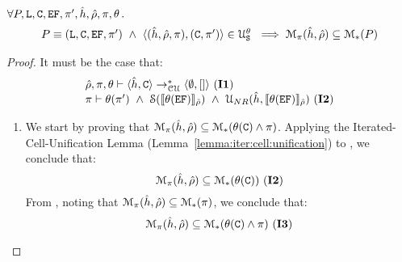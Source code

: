 \begin{temax}
$\forall P, \mathtt{L}, \mathtt{C}, \mathtt{EF}, \pi',  \hat{h}, \hat\rho, \pi, \theta \, .$
$$
\begin{array}{l}
P \equiv (\mathtt{L}, \mathtt{C}, \mathtt{EF}, \pi') \ \wedge \ \langle (\hat{h}, \hat\rho, \pi), (\mathtt{C}, \pi') \rangle \in {\cal U}_{\mathtt{S}}^{\theta} \
    \implies \mathcal{M}_{\pi}(\hat{h}, \hat\rho) \subseteq \mathcal{M}_{*}(P)   
\end{array}
$$ 
\end{temax}
\begin{proof}
It must be the case that: 
$$
\begin{array}{l}
\cellunificationiter{\sheap, \cells}{\hemp, []}{\sstore, \pc, \subst} \text{ (\ieq{1})} \\
%
\pc \vdash \subst(\pfs') \ \wedge \ \sanity{\symbeval{\subst(\efs)}{\sstore}} \ \wedge \  \unificationef{\sheap}{\symbeval{\subst(\efs)}{\sstore}} \text{ (\ieq{2})}
\end{array}
$$

\begin{enumerate}

\item We start by proving that $\mathcal{M}_{\pi}(\hat{h}, \hat\rho) \subseteq \mathcal{M}_{*}(\theta(\mathtt{C}) \wedge \pi)$. 
Applying the Iterated-Cell-Unification Lemma (Lemma~\ref{lemma:iter:cell:unification}) to \ieq{1}, 
we conclude that: 
$$
  \mathcal{M}_{\pi}(\hat{h}, \hat\rho) \subseteq \mathcal{M}_{*}(\theta(\mathtt{C})) \text{ ({\bf I2})}
$$  
From , noting that $\mathcal{M}_{\pi}(\hat{h}, \hat\rho) \subseteq \mathcal{M}_{*}(\pi)$, 
we conclude that: 
$$
\mathcal{M}_{\pi}(\hat{h}, \hat\rho) \subseteq \mathcal{M}_{*}(\theta(\mathtt{C}) \wedge \pi) \text{ ({\bf I3})}
$$  


\end{enumerate}
\end{proof}
